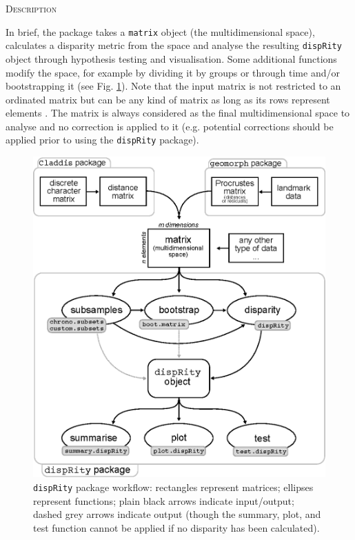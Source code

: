 \documentclass[12pt,letterpaper]{article}
\renewcommand{\section}[1]{%
\bigskip
\begin{center}
\begin{Large}
\normalfont\scshape #1
\medskip
\end{Large}
\end{center}}
\newcommand{\disp}{\texttt{dispRity} }
\begin{document}
\section{Description}
In brief, the package takes a \texttt{matrix} object (the multidimensional space), calculates a disparity metric from the space and analyse the resulting \texttt{dispRity} object through hypothesis testing and visualisation.
Some additional functions modify the space, for example by dividing it by groups or through time and/or bootstrapping it (see Fig. \ref{Fig:workflow}).
Note that the input matrix is not restricted to an ordinated matrix but can be any kind of matrix as long as its rows represent elements \citep[e.g. the space can be a distance matrix][]{Close2015}.
The matrix is always considered as the final multidimensional space to analyse and no correction is applied to it (e.g. potential corrections should be applied prior to using the \texttt{dispRity} package).

\begin{figure}[!htbp]
\centering
   \includegraphics[width=1\textwidth]{workflowsvg.eps} 
\caption{\disp package workflow: rectangles represent matrices; ellipses represent functions; plain black arrows indicate input/output; dashed grey arrows indicate output (though the summary, plot, and test function cannot be applied if no disparity has been calculated).}
\label{Fig:workflow}
\end{figure}
\end{document}
